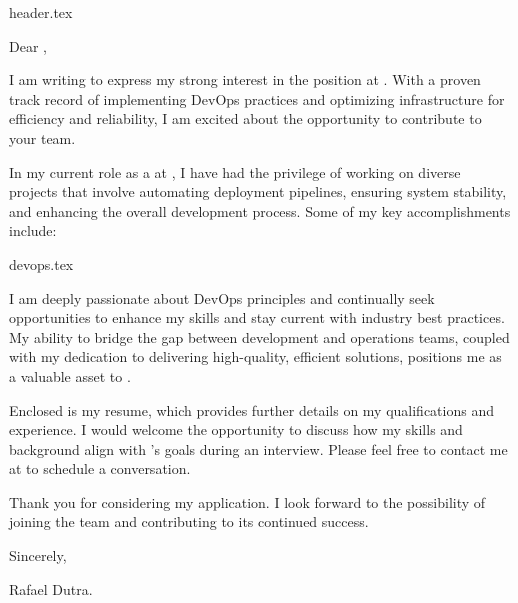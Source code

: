 \documentclass[a4paper,12pt]{article}
\begin{document}
\setlength{\parskip}{10px}

{header.tex}

Dear \desiredCompany{},

I am writing to express my strong interest in the \desiredPosition{} position at \desiredCompany{}. With a proven track record of implementing DevOps practices and optimizing infrastructure for efficiency and reliability, I am excited about the opportunity to contribute to your team.

\par
In my current role as a \currentPosition{} at \currentCompany{}, I have had the privilege of working on diverse projects that involve automating deployment pipelines, ensuring system stability, and enhancing the overall development process. Some of my key accomplishments include:

{devops.tex}

\par
I am deeply passionate about DevOps principles and continually seek opportunities to enhance my skills and stay current with industry best practices. My ability to bridge the gap between development and operations teams, coupled with my dedication to delivering high-quality, efficient solutions, positions me as a valuable asset to \desiredCompany{}.

\par
Enclosed is my resume, which provides further details on my qualifications and experience. I would welcome the opportunity to discuss how my skills and background align with \desiredCompany's goals during an interview. Please feel free to contact me at \personalEmail{} to schedule a conversation.

\par
Thank you for considering my application. I look forward to the possibility of joining the \desiredCompany{} team and contributing to its continued success.

\par
Sincerely,

\par
Rafael Dutra.
\end{document}
